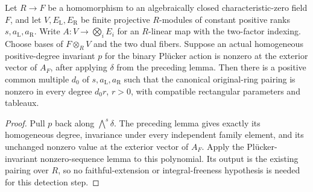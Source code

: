 \begin{lemma}
\label{lem:binary-plucker-nonzero-sequence}
\leanok
Let $R\to F$ be a homomorphism to an algebraically closed characteristic-zero
field $F$, and let $V,E_{\mathrm L},E_{\mathrm R}$ be finite projective
$R$-modules of constant positive ranks $s,a_{\mathrm L},a_{\mathrm R}$.
Write $A:V\to\bigotimes_i E_i$ for an $R$-linear map with the two-factor
indexing. Choose bases of $F\otimes_R V$ and the two dual fibers.
Suppose an actual homogeneous positive-degree invariant $p$ for the binary
Pl\"ucker action is nonzero at the exterior vector of $A_F$, after applying
$\delta$ from the preceding lemma. Then there is a positive common multiple
$d_0$ of $s,a_{\mathrm L},a_{\mathrm R}$ such that the canonical original-ring
pairing is nonzero in every degree $d_0r$, $r>0$, with compatible rectangular
parameters and tableaux.
\end{lemma}
\begin{proof}
Pull $p$ back along $\bigwedge^s\delta$. The preceding lemma gives exactly
its homogeneous degree, invariance under every independent family element,
and its unchanged nonzero value at the exterior vector of $A_F$.
Apply the Pl\"ucker-invariant nonzero-sequence lemma to this polynomial.
Its output is the existing pairing over $R$, so no faithful-extension or
integral-freeness hypothesis is needed for this detection step.
\end{proof}


